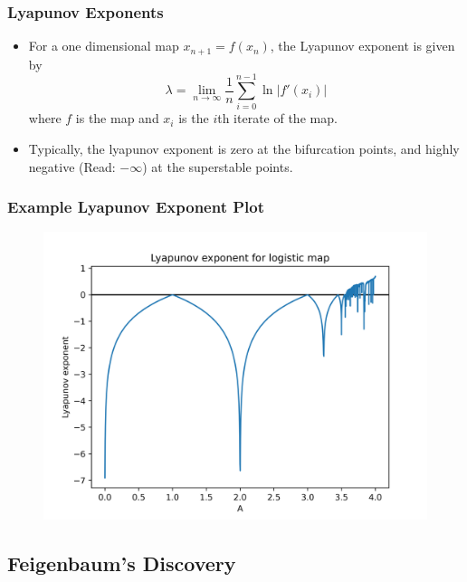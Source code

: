 \documentclass[
	11pt, %
	aspectratio=169, %
]{beamer}
\begin{document}

\begin{frame}
	\frametitle{Lyapunov Exponents}
    \begin{itemize}
        \item For a one dimensional map $x_{n+1} = f(x_n)$, the Lyapunov exponent is given by
        \begin{equation}
            \lambda = \lim_{n \to \infty} \frac{1}{n} \sum_{i=0}^{n-1} \ln \left| f'(x_i) \right|
        \end{equation}
        where $f$ is the map and $x_i$ is the $i$th iterate of the map. \pause
        \item Typically, the lyapunov exponent is zero at the bifurcation points, and highly negative (Read: $-\infty$) at the superstable points.
    \end{itemize}
\end{frame}


\begin{frame}
	\frametitle{Example Lyapunov Exponent Plot}
    \begin{figure}
        \includegraphics[width=0.6\linewidth]{logistic_lyapunov_exp.png}
    \end{figure}
\end{frame}


\subsection{Feigenbaum's Discovery}
\end{document}
